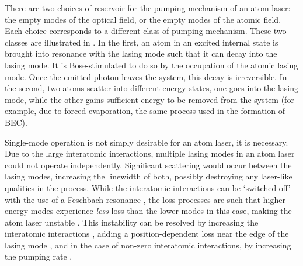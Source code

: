 There are two choices of reservoir for the pumping mechanism of an atom laser: the empty modes of the optical field, or the empty modes of the atomic field.  Each choice corresponds to a different class of pumping mechanism.  These two classes are illustrated in .  In the first, an atom in an excited internal state is brought into resonance with the lasing mode such that it can decay into the lasing mode.  It is Bose-stimulated to do so by the occupation of the atomic lasing mode.  Once the emitted photon leaves the system, this decay is irreversible.  In the second, two atoms scatter into different energy states, one goes into the lasing mode, while the other gains sufficient energy to be removed from the system (for example, due to forced evaporation, the same process used in the formation of BEC).

Single-mode operation is not simply desirable for an atom laser, it is necessary.  Due to the large interatomic interactions, multiple lasing modes in an atom laser could not operate independently.  Significant scattering would occur between the lasing modes, increasing the linewidth of both, possibly destroying any laser-like qualities in the process.  While the interatomic interactions can be `switched off' with the use of a Feschbach resonance \citep{Inouye:1998hy}, the loss processes are such that higher energy modes experience \emph{less} loss than the lower modes in this case, making the atom laser unstable \citep{Haine:2002kp}.  This instability can be resolved by increasing the interatomic interactions \citep{Haine:2002kp}, adding a position-dependent loss near the edge of the lasing mode \citep{Kneer:1998fk}, and in the case of non-zero interatomic interactions, by increasing the pumping rate \citep{Robins:2001pd}.

